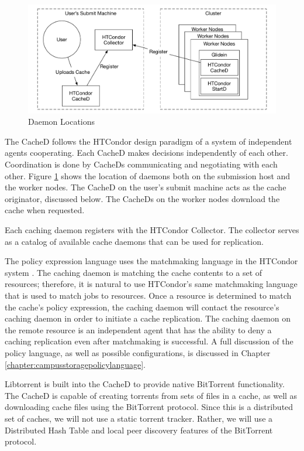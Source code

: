 \begin{figure}[ht]
	\centering
	\includegraphics[width=\textwidth]{images/DaemonLayout.pdf}
	\caption{Daemon Locations}
	\label{fig:daemonlayout}
\end{figure}


The CacheD follows the HTCondor design paradigm of a system of independent agents cooperating.  Each CacheD makes decisions independently of each other.  Coordination is done by CacheDs communicating and negotiating with each other.  Figure \ref{fig:daemonlayout} shows the location of daemons both on the submission host and the worker nodes.  The CacheD on the user's submit machine acts as the cache originator, discussed below.  The CacheDs on the worker nodes download the cache when requested.

Each caching daemon registers with the HTCondor Collector.  The collector serves as a catalog of available cache daemons that can be used for replication.

The policy expression language uses the matchmaking language in the HTCondor system \cite{raman1998matchmaking}.  The caching daemon is matching the cache contents to a set of resources; therefore, it is natural to use HTCondor's same matchmaking language that is used to match jobs to resources.  Once a resource is determined to match the cache's policy expression, the caching daemon will contact the resource's caching daemon in order to initiate a cache replication.  The caching daemon on the remote resource is an independent agent that has the ability to deny a caching replication even after matchmaking is successful.  A full discussion of the policy language, as well as possible configurations, is discussed in Chapter \ref{chapter:campusstoragepolicylanguage}.

Libtorrent \cite{nordberg2011rasterbar} is built into the CacheD to provide native BitTorrent functionality.  The CacheD is capable of creating torrents from sets of files in a cache, as well as downloading cache files using the BitTorrent protocol.  Since this is a distributed set of caches, we will not use a static torrent tracker.  Rather, we will use a Distributed Hash Table \cite{dinger2009decentralized} and local peer discovery \cite{legout2007clustering} features of the BitTorrent protocol.

